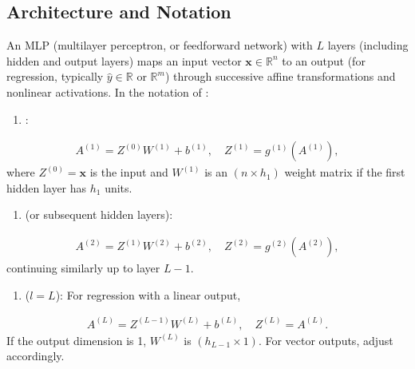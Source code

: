 \documentclass[letterpaper,10pt,english]{jupyterBook}
\begin{document}
\subsection{Architecture and Notation}
\label{\detokenize{04:architecture-and-notation}}
\sphinxAtStartPar
An MLP (multi\sphinxhyphen{}layer perceptron, or feed\sphinxhyphen{}forward network) with \(L\) layers (including hidden and output layers) maps an input vector \(\mathbf{x}\in\mathbb{R}^n\) to an output (for regression, typically \(\hat{y}\in\mathbb{R}\) or \(\mathbb{R}^m\)) through successive affine transformations and nonlinear activations. In the notation of :
\begin{enumerate}
%
\item {} 
\sphinxAtStartPar
{}:

\end{enumerate}
\begin{equation*}
\begin{split}
A^{(1)} = Z^{(0)} W^{(1)} + b^{(1)},\quad Z^{(1)} = g^{(1)}(A^{(1)}),
\end{split}
\end{equation*}
\sphinxAtStartPar
where \(Z^{(0)} = \mathbf{x}\) is the input and \(W^{(1)}\) is an \((n \times h_1)\) weight matrix if the first hidden layer has \(h_1\) units.
\begin{enumerate}
%
\setcounter{enumi}{1}
\item {} 
\sphinxAtStartPar
{} (or subsequent hidden layers):

\end{enumerate}
\begin{equation*}
\begin{split}
A^{(2)} = Z^{(1)} W^{(2)} + b^{(2)},\quad Z^{(2)} = g^{(2)}(A^{(2)}),
\end{split}
\end{equation*}
\sphinxAtStartPar
continuing similarly up to layer \(L-1\).
\begin{enumerate}
%
\setcounter{enumi}{2}
\item {} 
\sphinxAtStartPar
{} (\(l=L\)):
For regression with a linear output,

\end{enumerate}
\begin{equation*}
\begin{split}
A^{(L)} = Z^{(L-1)} W^{(L)} + b^{(L)},\quad Z^{(L)} = A^{(L)}.
\end{split}
\end{equation*}
\sphinxAtStartPar
If the output dimension is 1, \(W^{(L)}\) is \((h_{L-1} \times 1)\). For vector outputs, adjust accordingly.
\end{document}
